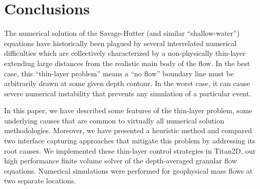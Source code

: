 \documentclass[letterpaper,10pt]{article}
\begin{document}



\section{Conclusions} \label{conclusions}
The numerical solution of the Savage-Hutter (and similar 
``shallow-water'') equations have historically been plagued by 
several interrelated numerical difficulties which are collectively 
characterized by a non-physically thin-layer extending 
large distances from the realistic main body of the flow. In the 
best case, this ``thin-layer problem'' means a ``no flow'' boundary 
line must be arbitrarily drawn at some given depth contour.  In 
the worst case, it can cause severe numerical instability that 
prevents any simulation of a particular event.

In this paper, we 
have described some features of the thin-layer problem,
some underlying causes that are common to virtually all numerical 
solution methodologies.  Moreover, we have presented a heuristic method and compared 
two interface capturing approaches that 
mitigate this problem by addressing its root causes.  We 
implemented these thin-layer control strategies in Titan2D, our high 
performance finite volume solver of the depth-averaged granular 
flow equations.  Numerical simulations were performed for 
geophysical mass flows at two separate locations.
\end{document}
